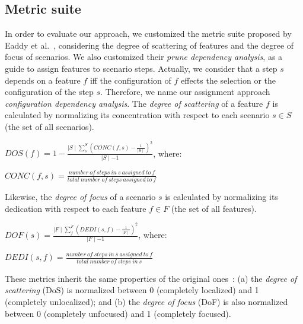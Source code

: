 \subsection{Metric suite}\label{sub:metric-suite}

In order to evaluate our approach, we customized the metric suite proposed by Eaddy et al.~\cite{Eaddy:2007aa},
considering the degree of scattering of features and the degree of focus of scenarios. We also customized their \emph{prune dependency analysis}, as a guide to
assign features to scenario steps. Actually, we consider that a step $s$ depends on a feature $f$ iff the configuration of $f$ effects the selection or the configuration of the step $s$. Therefore, we name our assignment approach
\emph{configuration dependency analysis}.  The \emph{degree of scattering} of a
feature $f$ is calculated by normalizing its concentration with respect to each
scenario $s \in S$ (the set of all scenarios).



%

\begin{center}
$DOS(f) = 1 - \frac{\mid S \mid \sum_{s}^{S}(CONC(f,s)-\frac{1}{\mid S
\mid})^2}{\mid S \mid -1}$, where:

$CONC(f,s) = \frac{number\ of\ steps\ in\ s\ assigned\ to\ f}{total\ number\
of\ steps\ assigned\ to\ f}$
\end{center}

Likewise, the \emph{degree of focus} of a scenario $s$ is calculated by
normalizing its dedication with respect to each feature $f \in F$ (the set of
all features).

\begin{center}
$DOF(s) = \frac{\mid F \mid \sum_{f}^{F}(DEDI(s,f)-\frac{1}{\mid F
\mid})^2}{\mid F \mid -1}$, where:

$DEDI(s,f) = \frac{number\ of\ steps\ in\ s\ assigned\ to\ f}{total\ number\
of\ steps\ in\ s}$
\end{center}

These metrics inherit the same properties of the original
ones~\cite{Eaddy:2007aa}: (a) the
\emph{degree of scattering} (DoS) is normalized between 0 (completely localized)
and 1 (completely unlocalized); and (b) the \emph{degree of focus} (DoF) is also
normalized between 0 (completely unfocused) and 1 (completely focused).



